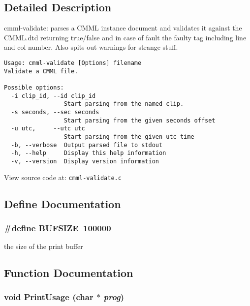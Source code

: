 \subsection{Detailed Description}
cmml-validate: parses a CMML instance document and validates it against the CMML.dtd returning true/false and in case of fault the faulty tag including line and col number. Also spits out warnings for strange stuff.



\footnotesize\begin{verbatim}
Usage: cmml-validate [Options] filename
Validate a CMML file.
 
Possible options:
  -i clip_id, --id clip_id
                 Start parsing from the named clip.
  -s seconds, --sec seconds
                 Start parsing from the given seconds offset
  -u utc,     --utc utc
                 Start parsing from the given utc time
  -b, --verbose  Output parsed file to stdout
  -h, --help     Display this help information
  -v, --version  Display version information
\end{verbatim}
\normalsize


View source code at: {\tt cmml-validate.c}

\subsection{Define Documentation}
\subsubsection{\setlength{\rightskip}{0pt plus 5cm}\#define BUFSIZE\ 100000}\label{cmml-validate_8c_a0}


the size of the print buffer 

\subsection{Function Documentation}
\subsubsection{\setlength{\rightskip}{0pt plus 5cm}void Print\-Usage (char $\ast$ {\em prog})\hspace{0.3cm}{\tt  [static]}}\label{cmml-validate_8c_a2}


